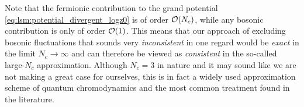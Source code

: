 Note that the fermionic contribution to the grand potential \eqref{eq:lsm:potential_divergent_logz0} is of order $\mathcal{O}(N_c)$,
while any bosonic contribution is only of order $\mathcal{O}(1)$.
This means that our approach of excluding bosonic fluctuations that sounds very \emph{inconsistent} in one regard
would be \emph{exact} in the limit $N_c \rightarrow \infty$
and can therefore be viewed as \emph{consistent} in the so-called large-$N_c$ approximation.
Although $N_c = 3$ in nature and it may sound like we are not making a great case for ourselves,
this is in fact a widely used  approximation scheme of quantum chromodynamics
and the most common treatment found in the literature.

